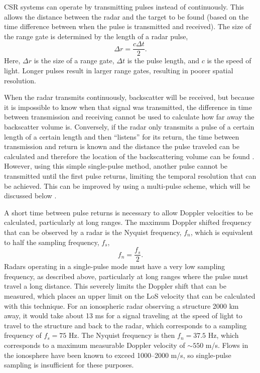 CSR systems can operate by transmitting pulses instead of continuously.  This allows the distance between the radar and the target to be found (based on the time difference between when the pulse is transmitted and received).  The size of the range gate is determined by the length of a radar pulse,
\begin{equation}
	\label{eqn:range_gate}
	\Delta r = \frac{c\Delta t}{2}.
\end{equation}
Here, \(\Delta r\) is the size of a range gate, \(\Delta t\) is the pulse length, and \(c\) is the speed of light.  Longer pulses result in larger range gates, resulting in poorer spatial resolution.

When the radar transmits continuously, backscatter will be received, but because it is impossible to know when that signal was transmitted, the difference in time between transmission and receiving cannot be used to calculate how far away the backscatter volume is.  Conversely, if the radar only transmits a pulse of a certain length of a certain length and then ``listens'' for its return, the time between transmission and return is known and the distance the pulse traveled can be calculated and therefore the location of the backscattering volume can be found \citep{Farley1972,Greenwald1983}.  However, using this simple single-pulse method, another pulse cannot be transmitted until the first pulse returns, limiting the temporal resolution that can be achieved.  This can be improved by using a multi-pulse scheme, which will be discussed below \citep{Farley1972,Greenwald1983,Greenwald1985}.

A short time between pulse returns is necessary to allow Doppler velocities to be calculated, particularly at long ranges.  The maximum Doppler shifted frequency that can be observed by a radar is the Nyquist frequency, \(f_n\), which is equivalent to half the sampling frequency, \(f_s\),
\begin{equation}	
	\label{eqn:nyquist}
	f_n = \frac{f_s}{2}.
\end{equation}
Radars operating in a single-pulse mode must have a very low sampling frequency, as described above, particularly at long ranges where the pulse must travel a long distance.  This severely limits the Doppler shift that can be measured, which places an upper limit on the LoS velocity that can be calculated with this technique.  For an ionospheric radar observing a structure 2000 km away, it would take about 13 ms for a signal traveling at the speed of light to travel to the structure and back to the radar, which corresponds to a sampling frequency of \(f_s = 75\) Hz.  The Nyquist frequency is then \(f_n = 37.5\) Hz, which corresponds to a maximum measurable Doppler velocity of \(\sim550\) m/s.  Flows in the ionosphere have been known to exceed 1000--2000 m/s, so single-pulse sampling is insufficient for these purposes.

